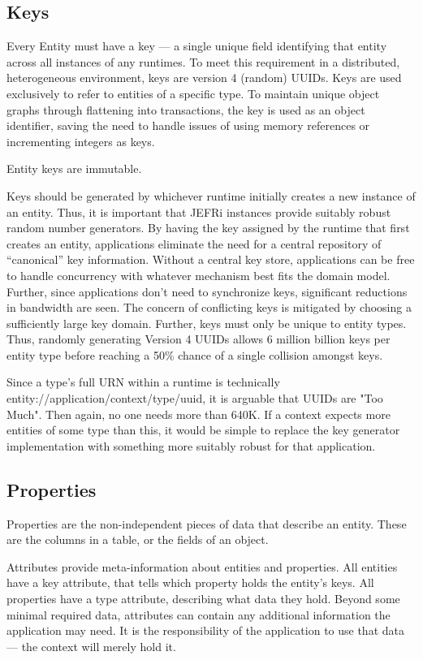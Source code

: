 \documentclass{article}
\begin{document}
\subsection{Keys}

Every Entity must have a key --- a single unique field identifying that entity
across all instances of any runtimes. To meet this requirement in a distributed,
heterogeneous environment, keys are version 4 (random) UUIDs. Keys are used
exclusively to refer to entities of a specific type. To maintain unique object
graphs through flattening into transactions, the key is used as an object
identifier, saving the need to handle issues of using memory references or
incrementing integers as keys.

Entity keys are immutable.

Keys should be generated by whichever runtime initially creates a new instance
of an entity. Thus, it is important that JEFRi instances provide suitably robust
random number generators. By having the key assigned by the runtime that first
creates an entity, applications eliminate the need for a central repository of
``canonical'' key information. Without a central key store, applications can be
free to handle concurrency with whatever mechanism best fits the domain model.
Further, since applications don't need to synchronize keys, significant
reductions in bandwidth are seen. The concern of conflicting keys is mitigated
by choosing a sufficiently large key domain. Further, keys must only be unique
to entity types. Thus, randomly generating Version 4 UUIDs allows 6 million
billion keys per entity type before reaching a 50\% chance of a single collision
amongst keys.

Since a type's full URN within a runtime is technically
entity://application/context/type/uuid, it is arguable that UUIDs are "Too
Much". Then again, no one needs more than 640K. If a context expects more
entities of some type than this, it would be simple to replace the key generator
implementation with something more suitably robust for that application.

\subsection{Properties}

Properties are the non-independent pieces of data that describe an entity. These
are the columns in a table, or the fields of an object.

Attributes provide meta-information about entities and
properties. All entities have a key attribute, that tells which property holds
the entity's keys. All properties have a type attribute, describing what data
they hold. Beyond some minimal required data, attributes can contain any
additional information the application may need. It is the responsibility of
the application to use that data --- the context will merely hold it.
\end{document}
